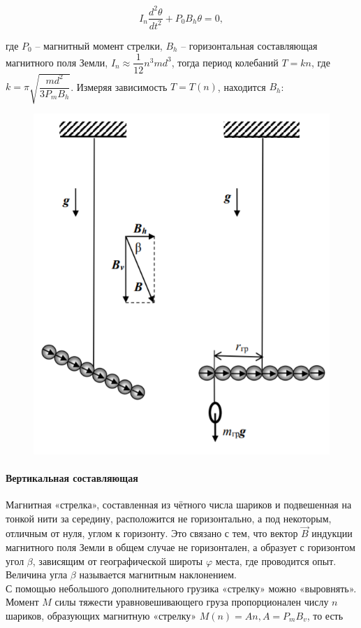 \documentclass[a4paper,12pt]{article}
\begin{document}
\begin{equation}
I_n \dfrac{d^2 \theta}{dt^2} + P_0 B_h \theta = 0,
\end{equation}

где $P_0$ -- магнитный момент стрелки, $B_h$ -- горизонтальная составляющая магнитного поля Земли, $I_n \approx \dfrac{1}{12}n^3 m d^3$, тогда период колебаний $T = kn$, где $k = \pi \sqrt{\dfrac{md^2}{3P_m B_h}}$. Измеряя зависимость $T=T(n)$, находится $B_h$:
\begin{center}
\end{center}
\begin{figure}
\includegraphics[scale=0.5]{2.png}
\end{figure} 
\paragraph*{Вертикальная составляющая} 
Магнитная «стрелка», составленная из чётного числа
шариков и подвешенная на тонкой нити за середину, расположится не горизонтально, а под некоторым, отличным от нуля, углом к горизонту. Это связано с тем, что вектор $\vec{B}$ индукции магнитного поля Земли в общем случае не горизонтален, а образует с горизонтом
угол $\beta$, зависящим от географической широты $\varphi$
места, где проводится опыт. Величина угла $\beta$
называется магнитным наклонением.\\
С помощью небольшого дополнительного грузика «стрелку» можно «выровнять». Момент $M$ силы тяжести уравновешивающего груза пропорционален числу $n$ шариков, образующих магнитную «стрелку» $M(n) = An, A=P_m B_v$, то есть
\begin{center}
\end{center}
\end{document}
